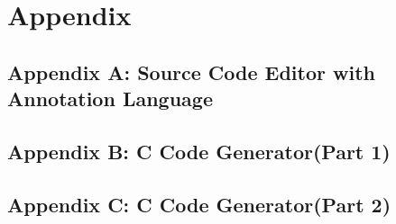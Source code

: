 \chapter{Appendix}
\section{Appendix A: Source Code Editor with Annotation Language}
  \label{Source_Code_Editor_in_Xtext}


\section{Appendix B: C Code Generator(Part 1)}	
	\label{C_Code_Generator_Xtend_Code_Snippet_p1}
	
	
\section{Appendix C: C Code Generator(Part 2)}	
\label{C_Code_Generator_Xtend_Code_Snippet_p2}
